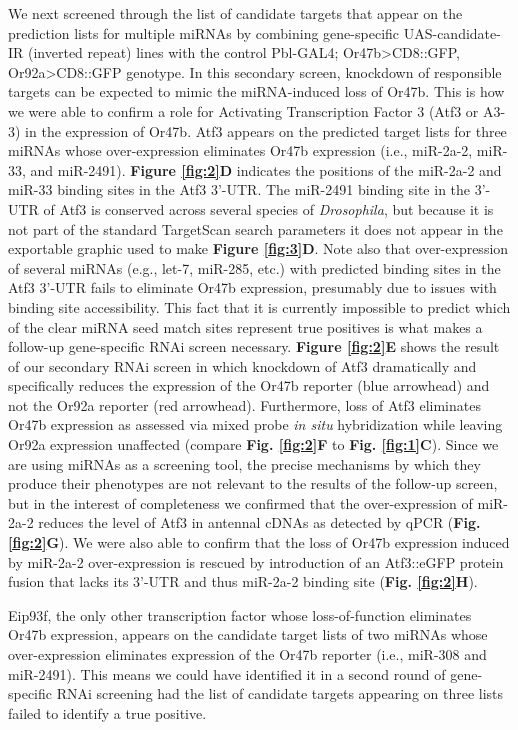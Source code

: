 We next screened through the list of candidate targets that appear on the prediction lists for multiple miRNAs by combining gene-specific UAS-candidate-IR (inverted repeat) lines with the control Pbl-GAL4; Or47b\textgreater{}CD8::GFP, Or92a\textgreater{}CD8::GFP genotype.
In this secondary screen, knockdown of responsible targets can be expected to mimic the miRNA-induced loss of Or47b.
This is how we were able to confirm a role for Activating Transcription Factor 3 (Atf3 or A3-3) in the expression of Or47b.
Atf3 appears on the predicted target lists for three miRNAs whose over-expression eliminates Or47b expression (i.e., miR-2a-2, miR-33, and miR-2491).
\textbf{Figure \ref{fig:2}D} indicates the positions of the miR-2a-2 and miR-33 binding sites in the Atf3 3'-UTR.
The miR-2491 binding site in the 3'-UTR of Atf3 is conserved across several species of \emph{Drosophila}, but because it is not part of the standard TargetScan search parameters it does not appear in the exportable graphic used to make \textbf{Figure \ref{fig:3}D}.
Note also that over-expression of several miRNAs (e.g., let-7, miR-285, etc.) with predicted binding sites in the Atf3 3'-UTR fails to eliminate Or47b expression, presumably due to issues with binding site accessibility.
This fact that it is currently impossible to predict which of the clear miRNA seed match sites represent true positives is what makes a follow-up gene-specific RNAi screen necessary.
\textbf{Figure \ref{fig:2}E} shows the result of our secondary RNAi screen in which knockdown of Atf3 dramatically and specifically reduces the expression of the Or47b reporter (blue arrowhead) and not the Or92a reporter (red arrowhead).
Furthermore, loss of Atf3 eliminates Or47b expression as assessed via mixed probe \emph{in situ} hybridization while leaving Or92a expression unaffected (compare \textbf{Fig. \ref{fig:2}F} to \textbf{Fig. \ref{fig:1}C}).
Since we are using miRNAs as a screening tool, the precise mechanisms by which they produce their phenotypes are not relevant to the results of the follow-up screen, but in the interest of completeness we confirmed that the over-expression of miR-2a-2 reduces the level of Atf3 in antennal cDNAs as detected by qPCR (\textbf{Fig. \ref{fig:2}G}). We were also able to confirm that the loss of Or47b expression induced by miR-2a-2 over-expression is rescued by introduction of an Atf3::eGFP protein fusion that lacks its 3'-UTR and thus miR-2a-2 binding site (\textbf{Fig.
\ref{fig:2}H}).

Eip93f, the only other transcription factor whose loss-of-function eliminates Or47b expression, appears on the candidate target lists of two miRNAs whose over-expression eliminates expression of the Or47b reporter (i.e., miR-308 and miR-2491).
This means we could have identified it in a second round of gene-specific RNAi screening had the list of candidate targets appearing on three lists failed to identify a true positive.

